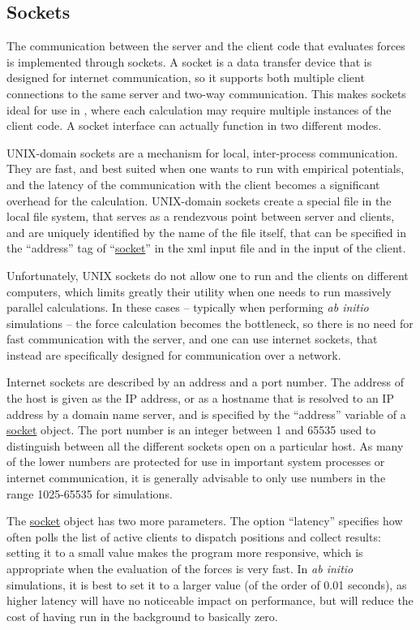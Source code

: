 \documentclass[11pt,english,fleqn]{report}
\begin{document}
\subsection{Sockets} \label{sockets}

The communication between the \ipi server and the client code that
evaluates forces is implemented through sockets. A socket is a 
data transfer device that is designed for internet communication,
so it supports both multiple client connections to the same server and
two-way communication. This makes sockets ideal for use in \ipi,
where each calculation may require multiple instances of the client code. 
A socket interface can actually function in two different modes.

UNIX-domain sockets are a mechanism for local, inter-process
communication. They are fast, and best suited when one wants
to run \ipi  with empirical potentials, and the latency of the 
communication with the client becomes a significant overhead
for the calculation. UNIX-domain sockets create a special file
in the local file system, that serves as a rendezvous point
between server and clients, and are uniquely identified by the
name of the file itself, that can be specified in the ``address'' tag of 
``\hyperref[FFSOCKET]{socket}'' in the xml input file and in 
the input of the client.

Unfortunately, UNIX sockets do not allow one to run \ipi{} and 
the clients on different computers, which limits greatly their 
utility when  one needs to run massively parallel calculations. 
In these cases -- typically when performing \emph{ab initio} 
simulations -- the force calculation becomes the bottleneck, so there is no
need for fast communication with the server, and one can 
use internet sockets, that instead are specifically designed
for communication over a network.

Internet sockets are described by an address and a port number.
The address of the host is given as the IP address,
or as a hostname that is resolved to an IP address by a domain name server,
and is specified by the {}``address'' variable of a 
\hyperref[FFSOCKET]{socket} object. 
The port number is an integer between 1 and 65535 used to distinguish
between all the different sockets open on a particular host. As
many of the lower numbers are protected for use in important system
processes or internet communication, it is generally advisable to
only use numbers in the range 1025-65535 for simulations.

The \hyperref[FFSOCKET]{socket} object has two more parameters.
The option ``latency'' specifies how often \ipi{} polls the list of 
active clients to dispatch positions and collect results:
setting it to a small value makes the program more responsive, 
which is appropriate when the evaluation of the forces is very
fast. In \emph{ab initio} simulations, it is best to set it to 
a larger value (of the order of 0.01 seconds), as higher latency 
will have no noticeable impact on performance, but will reduce 
the cost of having \ipi run in the background to basically zero. 
\end{document}
